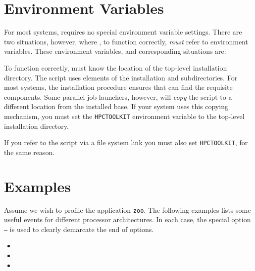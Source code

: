 \documentclass[english]{article}
\begin{document}
\section{Environment Variables}
For most systems,  requires no special environment variable settings.
There are two situations, however, where , to function correctly,
\emph{must} refer to environment variables. These environment variables, and
corresponding situations are:
\begin{Description}

  \item[\verb+HPCTOOLKIT+] To function correctly,  must know
       the location of the  top-level installation directory.
       The  script uses elements of the installation  and
        subdirectories. For most systems, the 
       installation procedure ensures that  can find the requisite
       components. Some parallel job launchers, however, will \emph{copy} the
        script to a different location from the installed base. If your
       system uses this copying mechanism, you must set the \verb+HPCTOOLKIT+
       environment variable to the top-level installation directory.
       
  \item[\verb+hpcrun+] If you refer to the  script via a file system link
       you must also set \verb+HPCTOOLKIT+, for the same reason.
       
\end{Description}


\section{Examples}

Assume we wish to profile the application \texttt{zoo}.
The following examples lists some useful events for different processor architectures.
In each case, the special option \texttt{--} is used to clearly demarcate the end of  options.

\begin{itemize}
\item {}
\item {}
\item {}
\end{itemize}
\end{document}
